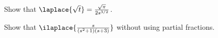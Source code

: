\begin{example}
    Show that $\laplace{\sqrt{t}} = \frac{\sqrt{\pi}}{2 s^{3/2}}$.
\end{example}

\begin{example}
Show that $\ilaplace{\frac{s}{(s^2+1)(s+3)}}$ without using partial fractions.
\end{example}